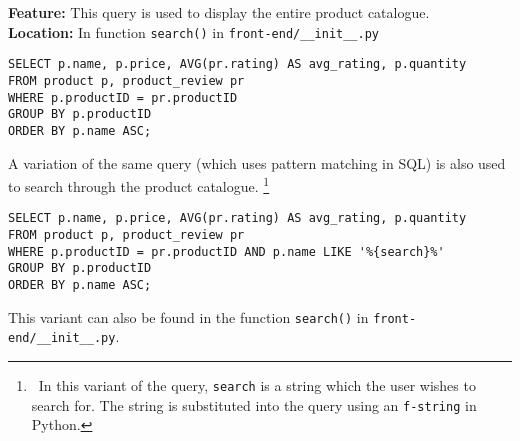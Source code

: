\textbf{Feature:} This query is used to display the entire product catalogue. \\
\textbf{Location:} In function \texttt{search()} in \texttt{front-end/\_\_init\_\_.py}

\begin{lstlisting}
SELECT p.name, p.price, AVG(pr.rating) AS avg_rating, p.quantity
FROM product p, product_review pr
WHERE p.productID = pr.productID
GROUP BY p.productID
ORDER BY p.name ASC;
\end{lstlisting}

A variation of the same query (which uses pattern matching in SQL) is also used to search through the product catalogue.
\footnote{
    \ In this variant of the query, \texttt{search} is a string which the user wishes to search for.
    The string is substituted into the query using an \texttt{f-string} in Python.
}

\begin{lstlisting}
SELECT p.name, p.price, AVG(pr.rating) AS avg_rating, p.quantity
FROM product p, product_review pr
WHERE p.productID = pr.productID AND p.name LIKE '%{search}%'
GROUP BY p.productID
ORDER BY p.name ASC;
\end{lstlisting}

This variant can also be found in the function \texttt{search()} in \texttt{front-end/\_\_init\_\_.py}. \\